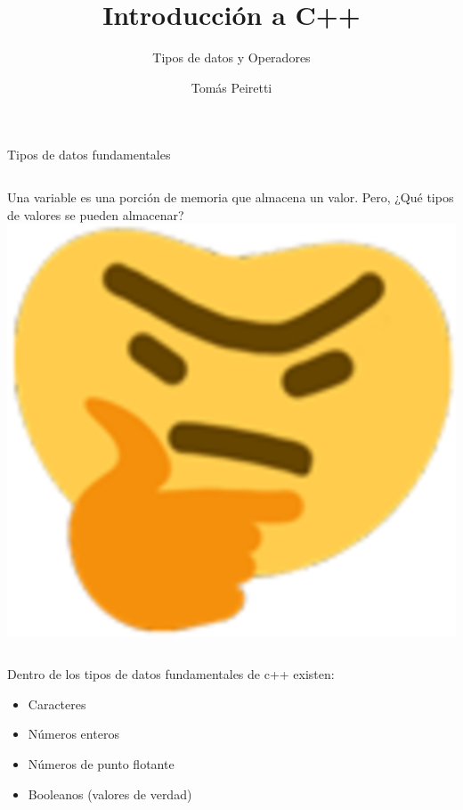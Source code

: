 \documentclass[12pt]{beamer}
\title{Introducción a C++}
\subtitle{Tipos de datos y Operadores}
\author{Tomás Peiretti}
\date{}
\begin{document}
\maketitle

\begin{frame}{Tipos de datos fundamentales}
    \begin{columns}
        Una variable es una porción de memoria que almacena un valor. Pero, ¿Qué \alert{tipos de valores} se pueden almacenar?
        \includegraphics[width=\textwidth]{thinking.png}
    \end{columns}

    \medskip

    Dentro de los tipos de datos fundamentales de c++ existen:
    \begin{itemize}
        \item Caracteres
        \item Números enteros
        \item Números de punto flotante
        \item Booleanos (valores de verdad)
    \end{itemize}
\end{frame}
\end{document}
